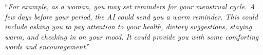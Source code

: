 ``\textit{For example, as a woman, you may set reminders for your menstrual cycle. A few days before your period, the AI could send you a warm reminder. This could include asking you to pay attention to your health, dietary suggestions, staying warm, and checking in on your mood. It could provide you with some comforting words and encouragement}.''
